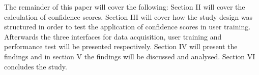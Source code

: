The remainder of this paper will cover the following: Section II will cover the calculation of confidence scores. Section III will cover how the study design was structured in order to test the application of confidence scores in user training. Afterwards the three interfaces for data acquisition, user training and performance test will be presented respectively. Section IV will present the findings and in section V the findings will be discussed and analysed. Section VI concludes the study.


 
 
% 
%
%
%
%
%
%

